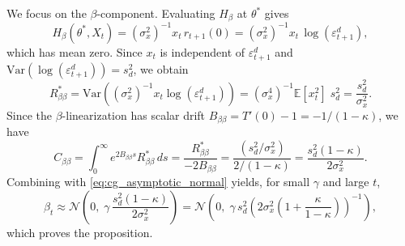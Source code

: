 \documentclass[11pt]{article}
\begin{document}
We focus on the $\beta$-component. Evaluating $H_\beta$ at $\theta^*$ gives
\[
H_\beta(\theta^*,X_t)
=
(\sigma_x^2)^{-1}x_t\,r_{t+1}(0)
=
(\sigma_x^2)^{-1}x_t\,\log(\varepsilon^d_{t+1}),
\]
which has mean zero. Since $x_t$ is independent of $\varepsilon^d_{t+1}$ and $\mathrm{Var}(\log(\varepsilon^d_{t+1}))=s_d^2$, we obtain
\begin{equation}\label{eq:Rstar_beta_app}
    R^*_{\beta\beta}
    =
    \mathrm{Var}\!\left((\sigma_x^2)^{-1}x_t\log(\varepsilon^d_{t+1})\right)
    =
    (\sigma_x^4)^{-1}\mathbb E[x_t^2]\;s_d^2
    =
    \frac{s_d^2}{\sigma_x^2}.
\end{equation}
Since the $\beta$-linearization has scalar drift $B_{\beta\beta}=T'(0)-1=-1/(1-\kappa)$, we have
\[
C_{\beta\beta}
=
\int_0^\infty e^{2B_{\beta\beta}s}R^*_{\beta\beta}\,ds
=
\frac{R^*_{\beta\beta}}{-2B_{\beta\beta}}
=
\frac{(s_d^2/\sigma_x^2)}{2/(1-\kappa)}
=
\frac{s_d^2(1-\kappa)}{2\sigma_x^2}.
\]
Combining with \eqref{eq:cg_asymptotic_normal} yields, for small $\gamma$ and large $t$,
\[
\beta_t
\approx
\mathcal N\!\left(0,\;\gamma\,\frac{s_d^2(1-\kappa)}{2\sigma_x^2}\right)
=
\mathcal N\!\left(0,\;\gamma\, s_d^2\left(2\sigma_x^2\left(1+\frac{\kappa}{1-\kappa}\right)\right)^{-1}\right),
\]
which proves the proposition.
\end{document}
